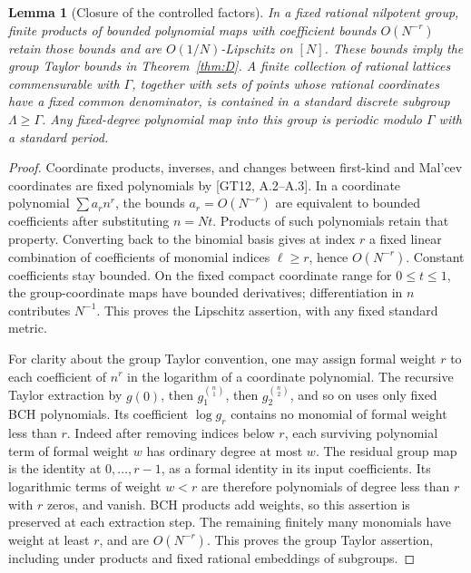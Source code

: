 \documentclass[11pt]{article}
\newtheorem{lemma}[theorem]{Lemma}
\begin{document}
\begin{lemma}[Closure of the controlled factors]\label{lem:closure}
In a fixed rational nilpotent group, finite products of bounded polynomial
maps with coefficient bounds $O(N^{-r})$ retain those bounds and are
$O(1/N)$-Lipschitz on $[N]$. These bounds imply the group Taylor bounds in
Theorem~\ref{thm:D}. A finite collection of rational lattices commensurable
with $\Gamma$, together with sets of points whose rational coordinates have
a fixed common denominator, is contained in a standard discrete subgroup
$\Lambda\geq\Gamma$. Any fixed-degree polynomial map into this group is
periodic modulo $\Gamma$ with a standard period.
\end{lemma}
\begin{proof}
Coordinate products, inverses, and changes between first-kind and Mal'cev
coordinates are fixed polynomials by [GT12, A.2--A.3]. In a coordinate
polynomial $\sum a_r n^r$, the bounds $a_r=O(N^{-r})$ are equivalent to
bounded coefficients after substituting $n=Nt$. Products of such polynomials
retain that property. Converting back to the binomial basis gives at index
$r$ a fixed linear combination of coefficients of monomial indices $\ell\geq r$,
hence $O(N^{-r})$. Constant coefficients stay bounded. On the fixed compact
coordinate range for $0\leq t\leq1$, the group-coordinate maps have bounded
derivatives; differentiation in $n$ contributes $N^{-1}$. This proves the
Lipschitz assertion, with any fixed standard metric.

For clarity about the group Taylor convention, one may assign formal weight
$r$ to each coefficient of $n^r$ in the logarithm of a coordinate polynomial.
The recursive Taylor extraction by $g(0)$, then $g_1^{\binom n1}$, then
$g_2^{\binom n2}$, and so on uses only fixed BCH polynomials. Its coefficient
$\log g_r$ contains no monomial of formal weight less than $r$.
Indeed after removing indices below $r$, each surviving polynomial term of
formal weight $w$ has ordinary degree at most $w$. The residual group map
is the identity at $0,\ldots,r-1$, as a formal identity in its input
coefficients. Its logarithmic terms of weight $w<r$ are therefore polynomials
of degree less than $r$ with $r$ zeros, and vanish. BCH products add weights,
so this assertion is preserved at each extraction step.
The remaining finitely many monomials have weight at least $r$, and are
$O(N^{-r})$. This proves the group Taylor assertion, including under products
and fixed rational embeddings of subgroups.


\end{proof}
\end{document}
